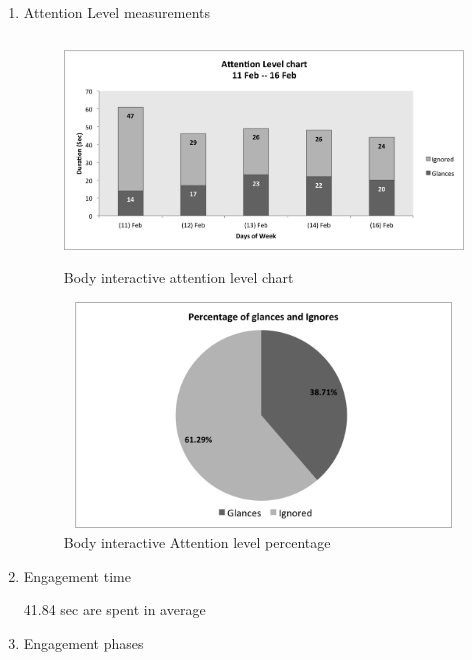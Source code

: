 \begin{enumerate}
\item Attention Level measurements


\begin{figure}[H]
    \centering
    \includegraphics[width=110mm,height=60mm]{Figures/8/body_inter_findings/Body_Inter_chart}%
    \caption{Body interactive attention level chart}%
    \label{fig:bodyattentionlevelchart}%
\end{figure}


\begin{figure}[H]
    \centering
    \includegraphics[width=110mm,height=60mm]{Figures/8/body_inter_findings/body_inter_percentage}
    \caption{Body interactive Attention level percentage}%
    \label{fig:bodyattentionlevelpercentage}%
\end{figure}



\item Engagement time

41.84 sec are spent in average



\item Engagement phases


\end{enumerate}

